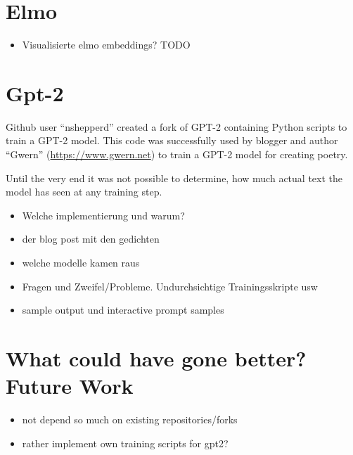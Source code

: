 \documentclass[sigconf,natbib=false]{acmart}
\begin{document}
\section{Elmo}

\begin{itemize}
	\item Visualisierte elmo embeddings? TODO
\end{itemize}

\section{Gpt-2}

Github user \enquote{nshepperd} created a fork of GPT-2 containing Python scripts to train a GPT-2 model. This code was successfully used by blogger and author \enquote{Gwern} (\url{https://www.gwern.net}) to train a GPT-2 model for creating poetry.


Until the very end it was not possible to determine, how much actual text the model has seen at any training step. 
\begin{itemize}
	\item Welche implementierung und warum?
	\item der blog post mit den gedichten
	\item welche modelle kamen raus
	\item Fragen und Zweifel/Probleme. Undurchsichtige Trainingsskripte usw
	\item sample output und interactive prompt samples
\end{itemize}



\section{What could have gone better? Future Work}

\begin{itemize}
	\item not depend so much on existing repositories/forks 
	\item rather implement own training scripts for gpt2?
	
\end{itemize}


 
%
%
%

\printbibliography
\end{document}

